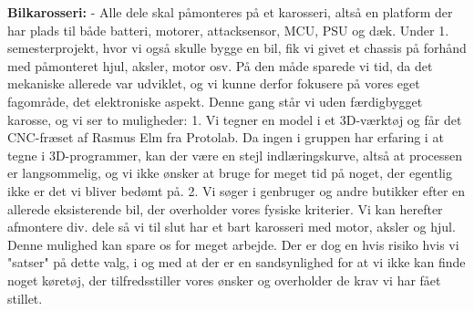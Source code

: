 \textbf{Bilkarosseri:}
- Alle dele skal påmonteres på et karosseri, altså en platform der har plads til både batteri, motorer, attacksensor, MCU, PSU og dæk.
Under 1. semesterprojekt, hvor vi også skulle bygge en bil, fik vi givet et chassis på forhånd med påmonteret hjul, aksler, motor osv. På den måde sparede vi tid, da det mekaniske allerede var udviklet, og vi kunne derfor fokusere på vores eget fagområde, det elektroniske aspekt.
Denne gang står vi uden færdigbygget karosse, og vi ser to muligheder:
1. Vi tegner en model i et 3D-værktøj og får det CNC-fræset af Rasmus Elm fra Protolab. Da ingen i gruppen har erfaring i at tegne i 3D-programmer, kan der være en stejl indlæringskurve, altså at processen er langsommelig, og vi ikke ønsker at bruge for meget tid på noget, der egentlig ikke er det vi bliver bedømt på.
2. Vi søger i genbruger og andre butikker efter en allerede eksisterende bil, der overholder vores fysiske kriterier. Vi kan herefter afmontere div. dele så vi til slut har et bart karosseri med motor, aksler og hjul.
Denne mulighed kan spare os for meget arbejde. Der er dog en hvis risiko hvis vi "satser" på dette valg, i og med at der er en sandsynlighed for at vi ikke kan finde noget køretøj, der tilfredsstiller vores ønsker og overholder de krav vi har fået stillet.
